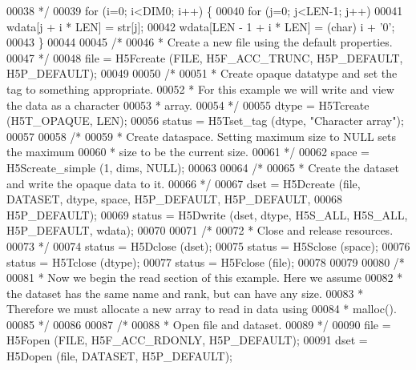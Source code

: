 \begin{DoxyCode}
00038 \textcolor{comment}{     */}
00039     \textcolor{keywordflow}{for} (i=0; i<DIM0; i++) \{
00040         \textcolor{keywordflow}{for} (j=0; j<LEN-1; j++)
00041             wdata[j + i * LEN] = str[j];
00042         wdata[LEN - 1 + i * LEN] = (char) i + \textcolor{charliteral}{'0'};
00043     \}
00044 
00045     \textcolor{comment}{/*}
00046 \textcolor{comment}{     * Create a new file using the default properties.}
00047 \textcolor{comment}{     */}
00048     file = H5Fcreate (FILE, H5F\_ACC\_TRUNC, H5P\_DEFAULT, H5P\_DEFAULT);
00049 
00050     \textcolor{comment}{/*}
00051 \textcolor{comment}{     * Create opaque datatype and set the tag to something appropriate.}
00052 \textcolor{comment}{     * For this example we will write and view the data as a character}
00053 \textcolor{comment}{     * array.}
00054 \textcolor{comment}{     */}
00055     dtype = H5Tcreate (H5T\_OPAQUE, LEN);
00056     status = H5Tset\_tag (dtype, \textcolor{stringliteral}{"Character array"});
00057 
00058     \textcolor{comment}{/*}
00059 \textcolor{comment}{     * Create dataspace.  Setting maximum size to NULL sets the maximum}
00060 \textcolor{comment}{     * size to be the current size.}
00061 \textcolor{comment}{     */}
00062     space = H5Screate\_simple (1, dims, NULL);
00063 
00064     \textcolor{comment}{/*}
00065 \textcolor{comment}{     * Create the dataset and write the opaque data to it.}
00066 \textcolor{comment}{     */}
00067     dset = H5Dcreate (file, DATASET, dtype, space, H5P\_DEFAULT, H5P\_DEFAULT,
00068                 H5P\_DEFAULT);
00069     status = H5Dwrite (dset, dtype, H5S\_ALL, H5S\_ALL, H5P\_DEFAULT, wdata);
00070 
00071     \textcolor{comment}{/*}
00072 \textcolor{comment}{     * Close and release resources.}
00073 \textcolor{comment}{     */}
00074     status = H5Dclose (dset);
00075     status = H5Sclose (space);
00076     status = H5Tclose (dtype);
00077     status = H5Fclose (file);
00078 
00079 
00080     \textcolor{comment}{/*}
00081 \textcolor{comment}{     * Now we begin the read section of this example.  Here we assume}
00082 \textcolor{comment}{     * the dataset has the same name and rank, but can have any size.}
00083 \textcolor{comment}{     * Therefore we must allocate a new array to read in data using}
00084 \textcolor{comment}{     * malloc().}
00085 \textcolor{comment}{     */}
00086 
00087     \textcolor{comment}{/*}
00088 \textcolor{comment}{     * Open file and dataset.}
00089 \textcolor{comment}{     */}
00090     file = H5Fopen (FILE, H5F\_ACC\_RDONLY, H5P\_DEFAULT);
00091     dset = H5Dopen (file, DATASET, H5P\_DEFAULT);

\end{DoxyCode}
